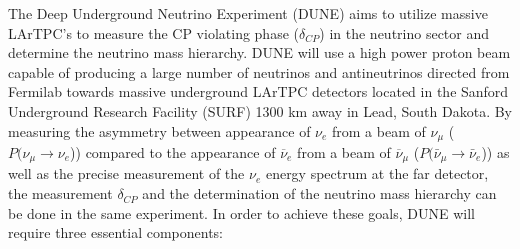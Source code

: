 The Deep Underground Neutrino Experiment (DUNE) \cite{DUNE} aims to utilize massive LArTPC's to measure the CP violating phase ($\delta_{CP}$) in the neutrino sector and determine the neutrino mass hierarchy. DUNE will use a high power proton beam capable of producing a large number of neutrinos and antineutrinos directed from Fermilab towards massive underground LArTPC detectors located in the Sanford Underground Research Facility (SURF) 1300 km away in Lead, South Dakota. By measuring the asymmetry between appearance of $\nu_{e}$ from a beam of $\nu_{\mu}$ ($P(\nu_{\mu} \rightarrow \nu_{e}$)) compared to the appearance of $\overline{\nu}_{e}$ from a beam of $\overline{\nu}_{\mu}$ ($P(\bar{\nu}_{\mu} \rightarrow \bar{\nu}_{e}$)) as well as the precise measurement of the $\nu_{e}$ energy spectrum at the far detector, the measurement $\delta_{CP}$ and the determination of the neutrino mass hierarchy can be done in the same experiment. In order to achieve these goals, DUNE will require three essential components:
